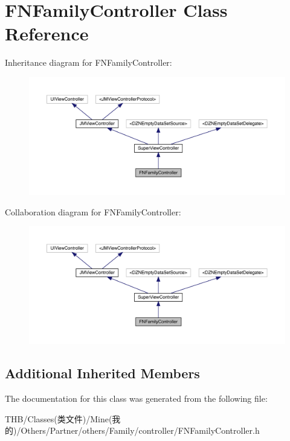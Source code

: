 \hypertarget{interface_f_n_family_controller}{}\section{F\+N\+Family\+Controller Class Reference}
\label{interface_f_n_family_controller}


Inheritance diagram for F\+N\+Family\+Controller\+:\nopagebreak
\begin{figure}[H]
\begin{center}
\leavevmode
\includegraphics[width=350pt]{interface_f_n_family_controller__inherit__graph}
\end{center}
\end{figure}


Collaboration diagram for F\+N\+Family\+Controller\+:\nopagebreak
\begin{figure}[H]
\begin{center}
\leavevmode
\includegraphics[width=350pt]{interface_f_n_family_controller__coll__graph}
\end{center}
\end{figure}
\subsection*{Additional Inherited Members}


The documentation for this class was generated from the following file\+:\begin{DoxyCompactItemize}
\item 
T\+H\+B/\+Classes(类文件)/\+Mine(我的)/\+Others/\+Partner/others/\+Family/controller/F\+N\+Family\+Controller.\+h\end{DoxyCompactItemize}
